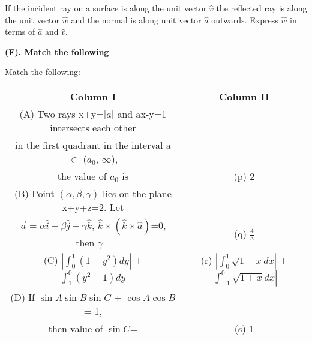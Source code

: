\item If the incident ray on a surface is along the unit vector $\hat{v}$ the reflected ray is along the unit vector 
 $\hat{w}$ and the normal is along unit vector $\hat{a}$ outwards. Express $\hat{w}$ in terms of $\hat{a}$ and $\hat{v}$.

\textbf{(F). Match the following}

\item Match the following:
\begin{table}[ht!]
\centering
\begin{tabular}{c c} 
 \textbf{Column I} & \textbf{Column II}\\ [0.5ex] 
 (A) Two rays x+y=$|a|$ and ax-y=1
  intersects each other\\ in the first
  quadrant in the interval a 
  $\in$ ($a_0$, $\infty$), \\
  the value of $a_0$ is                                               &(p) 2\\ 
 (B) Point $(\alpha,\beta,\gamma)$ lies on the plane x+y+z=2. 
 Let\\ $\overrightarrow{a}=\alpha\hat{i}+\beta\hat{j}+\gamma\hat{k}$, 
 $\hat{k} \times (\hat{k} \times \hat{a})$=0, then $\gamma$=          &(q) $\frac{4}{3}$\\
 (C) $|\int_{0}^{1}(1-y^{2})dy|$ 
 + $|\int_{1}^{0}(y^{2}-1)dy|$                                        &(r) $|\int_{0}^{1}\sqrt{1-x}dx|$
                                                                           +$|\int_{-1}^{0}\sqrt{1+x}dx|$\\
 (D) If $\sin A \sin B \sin C$ + $\cos A \cos B$ = 1,\\ 
 then value of $\sin C$=                                              &(s) 1\\[1ex] 
\end{tabular}
\end{table}\\

